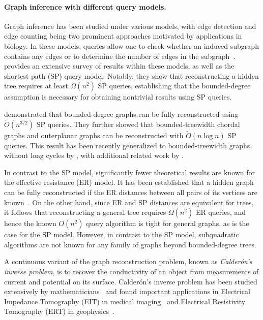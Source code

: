\paragraph{Graph inference with different query models.}
Graph inference has been studied under various models, with {edge detection} and {edge counting} being two prominent approaches motivated by applications in biology. In these models, queries allow one to check whether an induced subgraph contains any edges or to determine the number of edges in the subgraph~\citep{sicomp/AlonBKRS04, journals/jcss/AngluinC08, journals/siamdm/AlonA05, conf/wg/BouvelGK05}.~\citet{alt/ReyzinS07} provides an extensive survey of results within these models, as well as the shortest path (SP) query model. Notably, they show that reconstructing a hidden tree requires at least $\Omega(n^2)$ SP queries, establishing that the bounded-degree assumption is necessary for obtaining nontrivial results using SP queries.

\citet{journals/talg/KannanMZ18}
demonstrated that bounded-degree graphs can be fully reconstructed using $\widetilde{O}(n^{3/2})$ SP queries. They further showed that bounded-treewidth chordal graphs and outerplanar graphs can be reconstructed with $\widetilde{O}(n\log n)$ SP queries. This result has been recently generalized to bounded-treewidth graphs without long cycles by \citet{conf/iwpec/Bestide24}, with additional related work by \citet*{journals/tcs/RongLYW21}.

In contrast to the SP model, significantly fewer theoretical results are known for the {effective resistance (ER) model}. It has been established that a hidden graph can be fully reconstructed if the ER distances between all pairs of its vertices are known~\citep{journals/tcs/WittmannSBT09,Spielman2012TreesRecNotes,Hoskins2018Inferring}. On the other hand, since ER and SP distances are equivalent for trees, it follows that reconstructing a general tree requires $\Omega(n^2)$ ER queries, and hence the known $O(n^2)$ query algorithm is tight for general graphs, as is the case for the SP model. However, in contrast to the SP model, subquadratic algorithms are not known for any family of graphs beyond bounded-degree trees.

A continuous variant of the graph reconstruction problem, known as \emph{Calder\'{o}n's inverse problem}, is to recover the conductivity of an object from measurements of current and potential on its surface.  Calder\'{o}n's inverse problem has been studied extensively by mathematicians~\citep{Uhlmann2012} and found important applications in Electrical Impedance Tomography (EIT) in medical imaging~\citep{uhlmann2009electrical} and Electrical Resistivity Tomography (ERT) in geophysics~\citep{wikipediaERT}.

